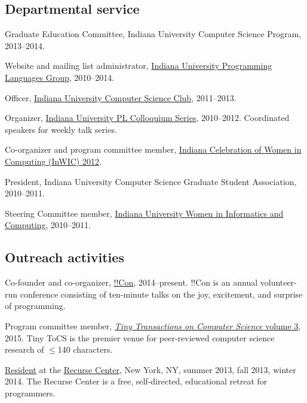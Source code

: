 \documentclass[10pt,letterpaper]{article}
\newenvironment{itemize*}
  {\begin{itemize}
      \setlength{\itemsep}{1pt}
      \setlength{\parskip}{3pt}
  }
  {\end{itemize}}
\begin{document}
\subsection*{Departmental service}

\begin{itemize*}
\item Graduate Education Committee, Indiana University Computer
  Science Program, 2013--2014.
  
\item Website and mailing list administrator,
  \href{http://lambda.soic.indiana.edu}{Indiana University Programming
    Languages Group}, 2010--2014.

\item Officer, \href{http://csclub.soic.indiana.edu}{Indiana
  University Computer Science Club}, 2011--2013.

\item Organizer, \href{http://lambda.soic.indiana.edu/talks}{Indiana
  University PL Colloquium Series}, 2010--2012.  Coordinated speakers
  for weekly talk series.

\item Co-organizer and program committee member,
  \href{http://www.cs.indiana.edu/inwic/}{Indiana Celebration of Women
    in Computing (InWIC) 2012}.

\item President, Indiana University Computer Science Graduate
  Student Association, 2010--2011.

\item Steering Committee member,
  \href{http://wic.soic.indiana.edu/}{Indiana University Women in
    Informatics and Computing}, 2010--2011.
\end{itemize*}

\subsection*{Outreach activities}

\begin{itemize*}
\item Co-founder and co-organizer,
  \href{http://www.bangbangcon.com}{!!Con}, 2014--present.  !!Con is
  an annual volunteer-run conference consisting of ten-minute talks on
  the joy, excitement, and surprise of programming.

\item Program committee member,
  \href{http://tinytocs.org/vol3/}{\emph{Tiny Transactions on Computer
      Science} volume 3}, 2015. Tiny ToCS is the premier venue for
  peer-reviewed computer science research of $\leq$140 characters.

\item \href{http://www.recurse.com/residents}{Resident} at the
  \href{http://www.recurse.com}{Recurse Center}, New York, NY, summer
  2013, fall 2013, winter 2014.  The Recurse Center is a free,
  self-directed, educational retreat for programmers.
\end{itemize*}
\end{document}
